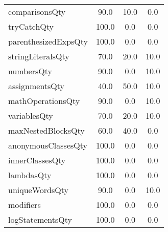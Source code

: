 \begin{tabular}{lccc}
comparisonsQty & 90.0 & 10.0 & 0.0 \\
tryCatchQty & 100.0 & 0.0 & 0.0 \\
parenthesizedExpsQty & 100.0 & 0.0 & 0.0 \\
stringLiteralsQty & 70.0 & 20.0 & 10.0 \\
numbersQty & 90.0 & 0.0 & 10.0 \\
assignmentsQty & 40.0 & 50.0 & 10.0 \\
mathOperationsQty & 90.0 & 0.0 & 10.0 \\
variablesQty & 70.0 & 20.0 & 10.0 \\
maxNestedBlocksQty & 60.0 & 40.0 & 0.0 \\
anonymousClassesQty & 100.0 & 0.0 & 0.0 \\
innerClassesQty & 100.0 & 0.0 & 0.0 \\
lambdasQty & 100.0 & 0.0 & 0.0 \\
uniqueWordsQty & 90.0 & 0.0 & 10.0 \\
modifiers & 100.0 & 0.0 & 0.0 \\
logStatementsQty & 100.0 & 0.0 & 0.0 \\
\bottomrule
              \end{tabular}
            